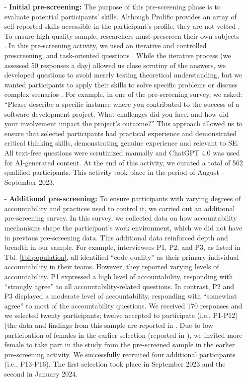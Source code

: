 \begin{itemize}

    \item [-] \textbf{Initial pre-screening:} The purpose of this pre-screening phase is to evaluate potential participants' skills. Although Prolific provides an array of self-reported skills accessible in the participant's profile, they are not vetted \citep{alami2024you}. To ensure high-quality sample, researchers must prescreen their own subjects \cite{chandler2017lie}. In this pre-screening activity, we used an iterative and controlled prescreening, and task-oriented questions \citep{alami2024you}. While the iterative process (we assessed 50 responses a day) allowed us close scrutiny of the answers, we developed questions to avoid merely testing theoretical understanding, but we wanted participants to apply their skills to solve specific problems or discuss complex scenarios \citep{alami2024you}. For example, in one of the pre-screening survey, we asked: ``Please describe a specific instance where you contributed to the success of a software development project. What challenges did you face, and how did your involvement impact the project's outcome?'' This approach allowed us to ensure that selected participants had practical experience and demonstrated critical thinking skills, demonstrating genuine experience and relevant to SE. All text-free questions were scrutinized manually and ChatGPT 4.0 was used for AI-generated content. At the end of this activity, we curated a total of 562 qualified participants. This activity took place in the period of August - September 2023.

    \item [-] \textbf{Additional pre-screening:} To ensure participants with varying degrees of accountability and practices used to control it, we carried out an additional pre-screening survey. In this survey, we collected data on how accountability mechanisms shape the participant's work environment, which we did not have in previous pre-screening data. This additional data reinforced depth and breadth in our sample. For example, interviewees P1, P2, and P3, as listed in Tbl. \ref{tbl:population}, all identified ``code quality'' as their primary individual accountability in their teams. However, they reported varying levels of accountability. P1 expressed a high level of accountability, responding with ``strongly agree'' to all accountability-related questions. In contrast, P2 and P3 displayed a moderate level of accountability, responding with ``somewhat agree'' to most of the accountability questions. We received 170 responses and we selected twenty participants; twelve accepted to participate (i.e., P1-P12) (the data and findings from this sample are reported in \citep{alami2024understanding}. Due to low participation of females in the earlier selection (reported in \citep{alami2024understanding}), we invited more female to take part in the study from the pre-screened sample in the earlier pre-screening activity. We successfully recruited four additional participants (i.e., P13-P16). The first selection took place in September 2023 and the second in January 2024.


\end{itemize}
